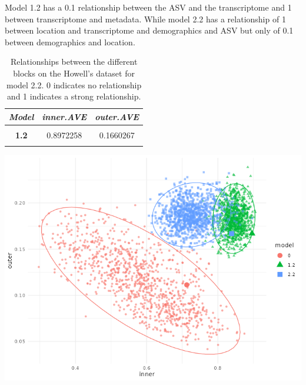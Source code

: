 \documentclass[
  12pt,
  a4paper,
  twoside,
  openright]{book}
\let\origfigure\figure
\let\endorigfigure\endfigure
\renewenvironment{figure}[1][2] {
    \expandafter\origfigure\expandafter[!htp]
} {
    \endorigfigure
}
\begin{document}
Model 1.2 has a 0.1 relationship between the ASV and the transcriptome and 1 between transcriptome and metadata.
While model 2.2 has a relationship of 1 between location and transcriptome and demographics and ASV but only of 0.1 between demographics and location.

\begin{table}[H]

\caption[Models 2.2 of the Howell's dataset.]{\label{tab:howell-models-ave}Relationships between the different blocks on the Howell's dataset for model 2.2. 0 indicates no relationship and 1 indicates a strong relationship.}
\centering
\begin{tabular}[t]{|>{}c|c|>{}c|}
\hline
\em{\textbf{Model}} & \em{\textbf{inner.AVE}} & \em{\textbf{outer.AVE}}\\
\hline
\textbf{\cellcolor{gray!6}{0.0}} & \cellcolor{gray!6}{0.7180980} & \cellcolor{gray!6}{0.1112390}\\
\hline
\textbf{1.2} & 0.8972258 & 0.1660267\\
\hline
\textbf{\cellcolor{gray!6}{2.2}} & \cellcolor{gray!6}{0.8433274} & \cellcolor{gray!6}{0.1659844}\\
\hline
\end{tabular}
\end{table}

\begin{figure}
\includegraphics[width=1\linewidth]{images/howells_models_bootstrap} \caption[Bootstrap of models on Howell's datset.]{Bootstrap of the different models on the inner and outer AVE: Model 0 has just trancriptomic and microbiome data, model 1.2 has transcriptomic, microbiome and sample data and model 2.2 has transcriptomic, microbiome and sample data split in different blocks. The bigger points are the models on the original dataset.}\label{fig:howell-bootstrap}
\end{figure}
\end{document}

